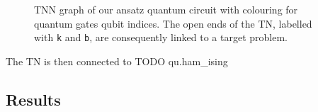 \begin{figure}[ht]
    \centering
     \quad
    
    \caption{TNN graph of our ansatz quantum circuit with colouring for \protect{} quantum gates \protect{} qubit indices. The open ends of the TN, labelled with \texttt{k} and \texttt{b}, are consequently linked to a target problem.}
    \label{fig:TNN_circuit}
\end{figure}

The TN is then connected to 
TODO qu.ham\_ising




\subsection{Results}



